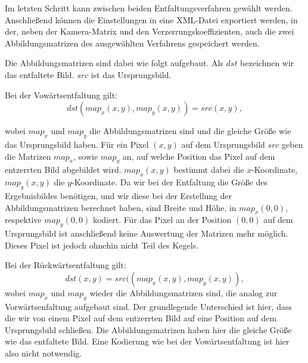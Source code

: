 Im letzten Schritt kann zwischen beiden Entfaltungsverfahren gewählt werden. Anschließend können die Einstellungen in eine XML-Datei exportiert werden, in der, neben der Kamera-Matrix und den Verzerrungskoeffizienten, auch die zwei Abbildungsmatrizen des ausgewählten Verfahrens gespeichert werden.


Die Abbildungsmatrizen sind dabei wie folgt aufgebaut. Als $dst$ bezeichnen wir das entfaltete Bild. $src$ ist das Ursprungsbild.

Bei der Vowärtsentfaltung gilt:
\[
dst(map_x(x,y), map_y(x,y)) = src(x,y),
\]

wobei $map_x$ und $map_y$ die Abbildungsmatrizen sind und die gleiche Größe wie das Ursprungsbild haben. Für ein Pixel $(x,y)$ auf dem Ursprungsbild $src$ geben die Matrizen $map_x$, sowie $map_y$ an, auf welche Position das Pixel auf dem entzerrten Bild abgebildet wird. $map_x(x,y)$ bestimmt dabei die $x$-Koordinate, $map_y(x,y)$ die $y$-Koordinate. Da wir bei der Entfaltung die Größe des Ergebnisbildes benötigen, und wir diese bei der Erstellung der Abbildungsmatrizen berechnet haben, sind Breite und Höhe, in $map_x(0,0)$, respektive $map_y(0,0)$ kodiert. Für das Pixel an der Position $(0,0)$ auf dem Ursprungsbild ist anschließend keine Auswertung der Matrizen mehr möglich. Dieses Pixel ist jedoch ohnehin nicht Teil des Kegels.

Bei der Rückwärtsentfaltung gilt:
\[
dst(x,y) = src((map_x(x,y),map_y(x,y)),
\]
wobei $map_x$ und $map_y$ wieder die Abbildungsmatrizen sind, die analog zur Vorwärtsenfaltung aufgebaut sind. Der grundlegende Unterschied ist hier, dass die wir von einem Pixel auf dem entzerrten Bild auf eine Position auf dem Ursprungsbild schließen. Die Abbildungsmatrizen haben hier die gleiche Größe wie das entfaltete Bild. Eine Kodierung wie bei der Vowärtsentfaltung ist hier also nicht notwendig.
